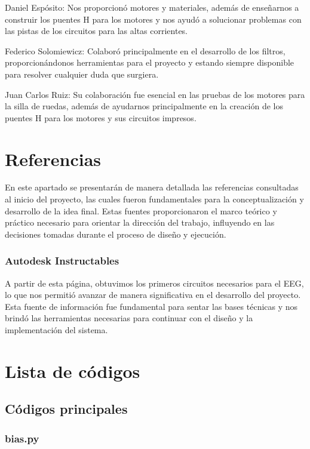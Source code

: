 \documentclass{article}
\begin{document}
Daniel Espósito: Nos proporcionó motores y materiales, además de enseñarnos a construir los puentes H para los motores y nos ayudó a solucionar problemas con las pistas de los circuitos para las altas corrientes.


Federico Solomiewicz: Colaboró principalmente en el desarrollo de los filtros, proporcionándonos herramientas para el proyecto y estando siempre disponible para resolver cualquier duda que surgiera.


Juan Carlos Ruiz: Su colaboración fue esencial en las pruebas de los motores para la silla de ruedas, además de ayudarnos principalmente en la creación de los puentes H para los motores y sus circuitos impresos.



\section{Referencias}
En este apartado se presentarán de manera detallada las referencias consultadas al inicio del proyecto, las cuales fueron fundamentales para la conceptualización y desarrollo de la idea final. Estas fuentes proporcionaron el marco teórico y práctico necesario para orientar la dirección del trabajo, influyendo en las decisiones tomadas durante el proceso de diseño y ejecución.
\subsubsection{Autodesk Instructables}
A partir de esta página, obtuvimos los primeros circuitos necesarios para el EEG, lo que nos permitió avanzar de manera significativa en el desarrollo del proyecto. Esta fuente de información fue fundamental para sentar las bases técnicas y nos brindó las herramientas necesarias para continuar con el diseño y la implementación del sistema.


\section{Lista de códigos}

\subsection{Códigos principales}

\subsubsection{bias.py}

\end{document}
